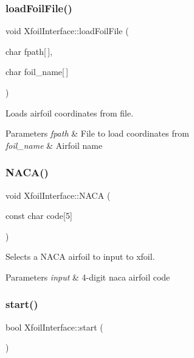 \subsubsection{\texorpdfstring{load\+Foil\+File()}{LoadFoilFile()}}
{\footnotesize\ttfamily void Xfoil\+Interface\+::load\+Foil\+File (\begin{DoxyParamCaption}\item[{char}]{fpath\mbox{[}$\,$\mbox{]},  }\item[{char}]{foil_name\mbox{[}$\,$\mbox{]} }\end{DoxyParamCaption})}



Loads airfoil coordinates from file. 


\begin{DoxyParams}{Parameters}
{\em fpath} & File to load coordinates from \\
\hline
{\em foil_name} & Airfoil name \\
\hline
\end{DoxyParams}
\mbox{\label{classXfoilInterface_a202072a14053054a55501c45a296bce7}} 
\subsubsection{\texorpdfstring{N\+A\+C\+A()}{NACA()}}
{\footnotesize\ttfamily void Xfoil\+Interface\+::\+N\+A\+CA (\begin{DoxyParamCaption}\item[{const char}]{code\mbox{[}5\mbox{]} }\end{DoxyParamCaption})}



Selects a N\+A\+CA airfoil to input to xfoil. 


\begin{DoxyParams}{Parameters}
{\em input} & 4-\/digit naca airfoil code \\
\hline
\end{DoxyParams}
\mbox{\label{classXfoilInterface_aba502bd5accaf23d3bdf342a82d5fb7f}} 
\subsubsection{\texorpdfstring{start()}{Start()}}
{\footnotesize\ttfamily bool Xfoil\+Interface\+::start (\begin{DoxyParamCaption}{ }\end{DoxyParamCaption})}



